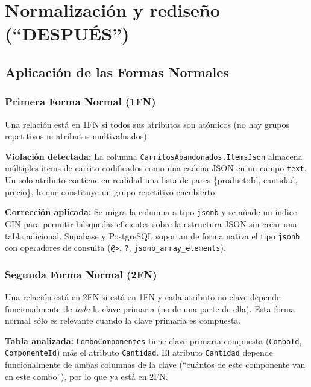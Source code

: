 
\section{Normalización y redise\~no (``DESPU\'ES'')}

\subsection{Aplicaci\'on de las Formas Normales}

\subsubsection{Primera Forma Normal (1FN)}

Una relaci\'on est\'a en 1FN si todos sus atributos son at\'omicos (no hay grupos repetitivos ni atributos multivaluados).

\textbf{Violaci\'on detectada:} La columna \texttt{CarritosAbandonados.ItemsJson} almacena m\'ultiples \'items de carrito codificados como una cadena JSON en un campo \texttt{text}.
Un solo atributo contiene en realidad una lista de pares \{productoId, cantidad, precio\}, lo que constituye un grupo repetitivo encubierto.

\textbf{Correcci\'on aplicada:} Se migra la columna a tipo \texttt{jsonb} y se a\~nade un \'indice GIN para permitir b\'usquedas eficientes sobre la estructura JSON sin crear una tabla adicional.
Supabase y PostgreSQL soportan de forma nativa el tipo \texttt{jsonb} con operadores de consulta (\texttt{@>}, \texttt{?}, \texttt{jsonb\_array\_elements}).

\subsubsection{Segunda Forma Normal (2FN)}

Una relaci\'on est\'a en 2FN si est\'a en 1FN y cada atributo no clave depende funcionalmente de \textit{toda} la clave primaria (no de una parte de ella).
Esta forma normal s\'olo es relevante cuando la clave primaria es compuesta.

\textbf{Tabla analizada:} \texttt{ComboComponentes} tiene clave primaria compuesta (\texttt{ComboId}, \texttt{ComponenteId}) m\'as el atributo \texttt{Cantidad}.
El atributo \texttt{Cantidad} depende funcionalmente de ambas columnas de la clave (``cu\'antos de este componente van en este combo''), por lo que ya est\'a en 2FN.

